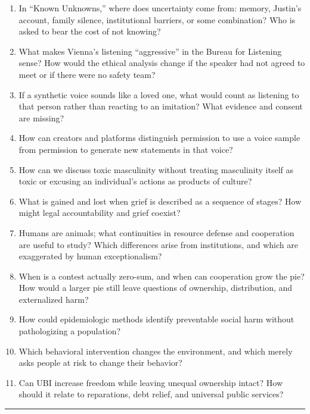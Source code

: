 \documentclass[
  11pt,
  letterpaper,
]{article}
\providecommand{\tightlist}{%
  \setlength{\itemsep}{0pt}\setlength{\parskip}{0pt}}
\begin{document}
\begin{enumerate}
\def\labelenumi{\arabic{enumi}.}
\tightlist
\item
  In ``Known Unknowns,'' where does uncertainty come from: memory,
  Justin's account, family silence, institutional barriers, or some
  combination? Who is asked to bear the cost of not knowing?
\item
  What makes Vienna's listening ``aggressive'' in the Bureau for
  Listening sense? How would the ethical analysis change if the speaker
  had not agreed to meet or if there were no safety team?
\item
  If a synthetic voice sounds like a loved one, what would count as
  listening to that person rather than reacting to an imitation? What
  evidence and consent are missing?
\item
  How can creators and platforms distinguish permission to use a voice
  sample from permission to generate new statements in that voice?
\item
  How can we discuss toxic masculinity without treating masculinity
  itself as toxic or excusing an individual's actions as products of
  culture?
\item
  What is gained and lost when grief is described as a sequence of
  stages? How might legal accountability and grief coexist?
\item
  Humans are animals; what continuities in resource defense and
  cooperation are useful to study? Which differences arise from
  institutions, and which are exaggerated by human exceptionalism?
\item
  When is a contest actually zero-sum, and when can cooperation grow the
  pie? How would a larger pie still leave questions of ownership,
  distribution, and externalized harm?
\item
  How could epidemiologic methods identify preventable social harm
  without pathologizing a population?
\item
  Which behavioral intervention changes the environment, and which
  merely asks people at risk to change their behavior?
\item
  Can UBI increase freedom while leaving unequal ownership intact? How
  should it relate to reparations, debt relief, and universal public
  services?
\end{enumerate}

\begin{center}\rule{0.5\linewidth}{0.5pt}\end{center}
\end{document}
